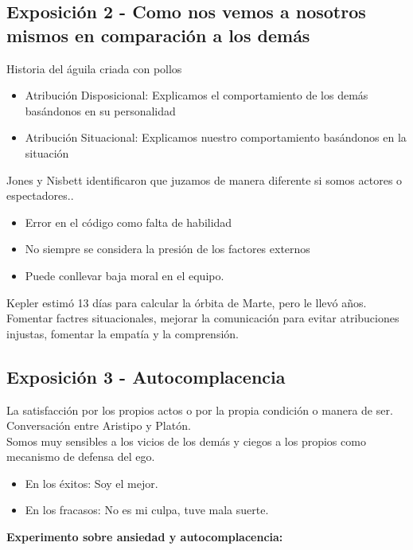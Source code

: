 \documentclass[12pt, a4paper, twoside]{article}
\begin{document}
\subsection{Exposición 2 - Como nos vemos a nosotros mismos en comparación a los demás}
Historia del águila criada con pollos
\begin{itemize}
    \item{Atribución Disposicional: Explicamos el comportamiento de los demás basándonos en su personalidad}
    \item {Atribución Situacional: Explicamos nuestro comportamiento basándonos en la situación}
\end{itemize}
Jones  y Nisbett identificaron que juzamos de manera diferente si somos actores o espectadores..

\begin{itemize}
    \item{Error en el código como falta de habilidad}
    \item{No siempre se considera la presión de los factores externos}
    \item {Puede conllevar baja moral en el equipo.}
\end{itemize}

Kepler estimó 13 días para calcular la órbita de Marte, pero le llevó años.\\

Fomentar factres situacionales, mejorar la comunicación para evitar atribuciones injustas,
fomentar la empatía y la comprensión.\\

\subsection{Exposición 3 - Autocomplacencia}

La satisfacción por los propios actos o por la propia condición o manera de ser.\\
Conversación entre Aristipo y Platón.\\
Somos muy sensibles a los vicios de los demás y ciegos a los propios como mecanismo
de defensa del ego. \\
\begin{itemize}
    \item{En los éxitos: Soy el mejor.}
    \item{En los fracasos: No es mi culpa, tuve mala suerte.}
\end{itemize}
\textbf{Experimento sobre ansiedad y autocomplacencia:} 
\end{document}
